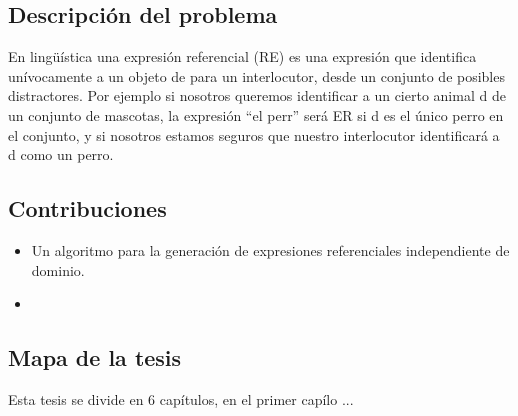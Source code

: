 
\subsection{Descripci\'on del problema}


En lingüística una expresión referencial (RE) es una expresión que identifica unívocamente a un objeto de para un interlocutor, desde un conjunto de posibles distractores. Por ejemplo si nosotros queremos identificar a un cierto animal d de un conjunto de mascotas, la expresión ``el perr'' será ER si d es el único perro en el conjunto, y si nosotros estamos seguros que nuestro interlocutor identificará a d como un perro.


\subsection{Contribuciones}

\begin{itemize}
 \item Un algoritmo para la generaci\'on de expresiones referenciales independiente de dominio.
 \item
\end{itemize}

\subsection{Mapa de la tesis}
Esta tesis se divide en 6 cap\'{i}tulos, en el primer cap\'{i}lo ...

